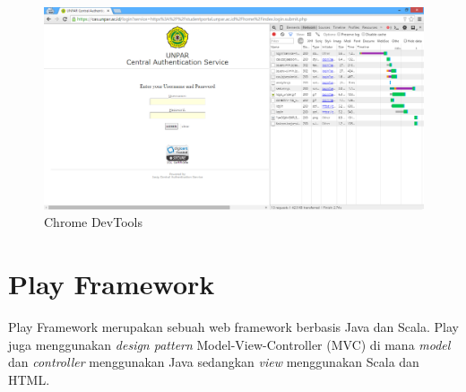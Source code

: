 \begin{figure}
	\centering
	\includegraphics[scale=0.5]{Gambar/chrome-devtools}
	\caption{Chrome DevTools} 
	\label{fig:chrome_devtools}
\end{figure}



\section{Play Framework}
\label{sec:play}

Play Framework \cite{Leroux:2014} merupakan sebuah web framework berbasis Java dan Scala. Play juga menggunakan \textit{design pattern} Model-View-Controller (MVC) di mana \textit{model} dan \textit{controller} menggunakan Java sedangkan \textit{view} menggunakan Scala dan HTML. 
